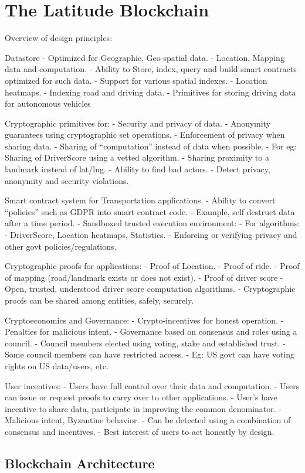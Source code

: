 \section{The Latitude Blockchain}\label{sec:design}


Overview of design principles:

Datastore
 - Optimized for Geographic, Geo-spatial data.
 - Location, Mapping data and computation.
 - Ability to Store, index, query and build smart contracts optimized for such data.
 - Support for various spatial indexes.
 - Location heatmaps.
 - Indexing road and driving data.
 - Primitives for storing driving data for autonomous vehicles

Cryptographic primitives for:
 - Security and privacy of data.
 - Anonymity guarantees using cryptographic set operations.
 - Enforcement of privacy when sharing data.
 - Sharing of “computation” instead of data when possible.
 - For eg: Sharing of DriverScore using a vetted algorithm.
 - Sharing proximity to a landmark instead of lat/lng.
 - Ability to find bad actors.
 - Detect privacy, anonymity and security violations.


Smart contract system for Transportation applications.
 - Ability to convert “policies” such as GDPR into smart contract code.
 - Example, self destruct data after a time period.
 - Sandboxed trusted execution environment:
 - For algorithms:
   - DriverScore, Location heatmaps, Statistics.
   - Enforcing or verifying privacy and other govt policies/regulations.

Cryptographic proofs for applications:
 - Proof of Location. 
 - Proof of ride. 
 - Proof of mapping 
      (road/landmark exists or does not exist).
 - Proof of driver score 
 - Open, trusted, understood driver score computation algorithms.
 - Cryptographic proofs can be shared among entities, safely, securely.


Cryptoeconomics and Governance:
 - Crypto-incentives for honest operation.
 - Penalties for malicious intent.
 - Governance based on consensus and roles using a council.
 - Council members elected using voting, stake and established trust.
 - Some council members can have restricted access.
 - Eg: US govt can have voting rights on US data/users, etc.

User incentives:
 - Users have full control over their data and computation.
 - Users can issue or request proofs to carry over to other applications.
 - User’s have incentive to share data, participate in improving the common denominator.
 - Malicious intent, Byzantine behavior.
   - Can be detected using a combination of consensus and incentives.
   - Best interest of users to act honestly by design.

\subsection{Blockchain Architecture}


